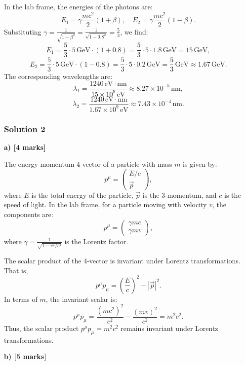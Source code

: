 \documentclass{article}
\begin{document}
In the lab frame, the energies of the photons are:
\[
E_1 = \gamma \frac{mc^2}{2} (1 + \beta), \quad E_2 = \gamma \frac{mc^2}{2} (1 - \beta).
\]
Substituting \(\gamma = \frac{1}{\sqrt{1 - \beta^2}} = \frac{1}{\sqrt{1 - 0.8^2}} = \frac{5}{3}\), we find:
\[
E_1 = \frac{5}{3} \cdot 5 \, \text{GeV} \cdot (1 + 0.8) = \frac{5}{3} \cdot 5 \cdot 1.8 \, \text{GeV} = 15 \, \text{GeV},
\]
\[
E_2 = \frac{5}{3} \cdot 5 \, \text{GeV} \cdot (1 - 0.8) = \frac{5}{3} \cdot 5 \cdot 0.2 \, \text{GeV} = \frac{5}{3} \, \text{GeV} \approx 1.67 \, \text{GeV}.
\]
The corresponding wavelengths are:
\[
\lambda_1 = \frac{1240 \, \text{eV} \cdot \text{nm}}{15 \times 10^9 \, \text{eV}} \approx 8.27 \times 10^{-5} \, \text{nm},
\]
\[
\lambda_2 = \frac{1240 \, \text{eV} \cdot \text{nm}}{1.67 \times 10^9 \, \text{eV}} \approx 7.43 \times 10^{-4} \, \text{nm}.
\]

\subsubsection{Solution 2}
\textbf{a) [4 marks]} 

The energy-momentum 4-vector of a particle with mass \(m\) is given by:
\[
p^\mu = \begin{pmatrix} E/c \\ \vec{p} \end{pmatrix},
\]
where \(E\) is the total energy of the particle, \(\vec{p}\) is the 3-momentum, and \(c\) is the speed of light. In the lab frame, for a particle moving with velocity \(v\), the components are:
\[
p^\mu = \begin{pmatrix} \gamma mc \\ \gamma mv \end{pmatrix},
\]
where \(\gamma = \frac{1}{\sqrt{1 - v^2/c^2}}\) is the Lorentz factor.

The scalar product of the 4-vector is invariant under Lorentz transformations. That is,
\[
p^\mu p_\mu = \left(\frac{E}{c}\right)^2 - |\vec{p}|^2.
\]
In terms of \(m\), the invariant scalar is:
\[
p^\mu p_\mu = \frac{(mc^2)^2}{c^2} - \frac{(mv)^2}{c^2} = m^2c^2.
\]
Thus, the scalar product \(p^\mu p_\mu = m^2c^2\) remains invariant under Lorentz transformations.

\textbf{b) [5 marks]}
\end{document}
